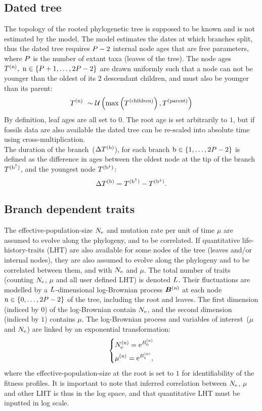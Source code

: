 \subsection{Dated tree}
The topology of the rooted phylogenetic tree is supposed to be known and is not estimated by the model. The model estimates the dates at which branches split, thus the dated tree requires $P - 2$ internal node ages that are free parameters, where $P$ is the number of extant taxa (leaves of the tree). 
The node ages $T^{(\text{n})},\ \text{n} \in \{P + 1, \hdots, 2 P - 2\}$ are drawn uniformly such that a node can not be younger than the oldest of its $2$ descendant children, and must also be younger than its parent:
\begin{equation}
\label{eq:Distribage}
\age\nodeexp \ \sim \mathcal{U}\left( \mathrm{max}\left(\age^{(\mathrm{children})} \right), \age^{(\mathrm{parent})} \right)
\end{equation}
By definition, leaf ages are all set to $0$. The root age is set arbitrarily to $1$, but if fossils data are also available the dated tree can be re-scaled into absolute time using cross-multiplication.\\
The duration of the branch~($\Delta T^{(\text{b})}$), for each branch $\text{b} \in \{1, \hdots, 2 P - 2\}$ is defined as the difference in ages between the oldest node at the tip of the branch $T^{(\text{b}^{\uparrow})}$, and the youngest node $T^{(\text{b}^{\downarrow})}$:
\begin{equation}
\label{eq:ageTobranchtime}
\branchtime\branchexp = \age^{(\nodeUp)} - \age^{(\nodeDown)}.
\end{equation}
\subsection{Branch dependent traits}
The \gls{effective-population-size} $N_{\mathrm{e}}$ and mutation rate per unit of time $\mu$ are assumed to evolve along the phylogeny, and to be correlated.
If quantitative life-history-traits (LHT) are also available for some nodes of the tree (leaves and/or internal nodes), they are also assumed to evolve along the phylogeny and to be correlated between them, and with $N_{\mathrm{e}}$ and $\mu$.
The total number of traits (counting $N_{\mathrm{e}}$, $\mu$ and all user defined LHT) is denoted $L$.
Their fluctuations are modelled by a $L$-dimensional log-Brownian process $\bm{B}^{(\text{n})}$ at each node $\text{n} \in \{0, \hdots, 2 P - 2\}$ of the tree, including the root and leaves.
The first dimension (indiced by $0$) of the log-Brownian contain $N_{\mathrm{e}}$, and the second dimension (indiced by $1$) contains $\mu$.
The log-Brownian process and variables of interest~($\mu$ and $N_{\mathrm{e}}$) are linked by an exponential transformation:
\begin{equation}
\begin{dcases}
N_{\mathrm{e}}^{(\text{n})} = \mathrm{e}^{ B_{0}^{(\text{n})} } \\ 
\mu^{(\text{n})} = \mathrm{e}^{ B_{1}^{(\text{n})} },
\end{dcases}
\end{equation}
where the \gls{effective-population-size} at the root is set to $1$ for identifiability of the fitness profiles.
It is important to note that inferred correlation between $N_{\mathrm{e}}$, $\mu$ and other LHT is thus in the log space, and that quantitative LHT must be inputted in log scale.

